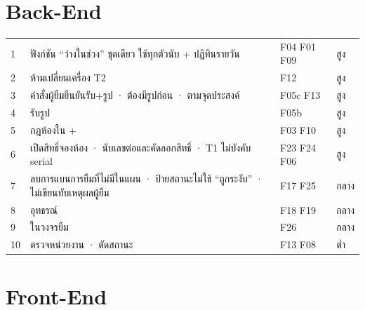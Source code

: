 \section{Back-End}

\begin{table}[H]
\centering\small
\begin{tabular}{L{1cm}L{9.4cm}L{2.2cm}L{1.6cm}}
 & ฟังก์ชัน ``ว่างในช่วง'' ชุดเดียว ใช้ทุกตัวนับ +  ปฏิทินรายวัน & F04 F01 F09 & สูง \\
2 &  ห้ามเปลี่ยนเครื่อง T2 & F12 & สูง \\
3 & คำสั่งผู้ยืมยืนยันรับ+รูป ·  ต้องมีรูปก่อน ·  ตามจุดประสงค์ & F05c F13 & สูง \\
4 &  รับรูป & F05b & สูง \\
5 & กฎห้องใน  +   & F03 F10 & สูง \\
6 & เปิดสิทธิ์จองห้อง ·  นับเลขต่อและคัดลอกสิทธิ์ · T1 ไม่บังคับ serial & F23 F24 F06 & สูง \\
7 & ลบการแบนการยืมที่ไม่มีในแผน · ป้ายสถานะไม่ใช้ ``ถูกระงับ'' · ไม่เขียนทับเหตุผลผู้ยืม & F17 F25 & กลาง \\
8 &  อุทธรณ์ & F18 F19 & กลาง \\
9 &  ในวงจรยืม & F26 & กลาง \\
10 &  ตรวจหน่วยงาน · ตัดสถานะ  & F13 F08 & ต่ำ \\
\bottomrule
\end{tabular}
\end{table}

\section{Front-End}

